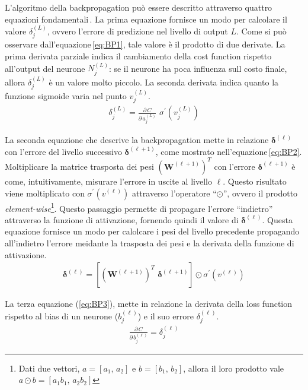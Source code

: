 L'algoritmo della backpropagation può essere descritto attraverso quattro equazioni fondamentali\,\cite{nielsen2015neural}. La prima equazione fornisce un modo per calcolare il valore $\delta^{(L)}_j$, ovvero l'errore di predizione nel livello di output $L$. Come si può osservare dall'equazione\,\ref{eq:BP1}, tale valore è il prodotto di due derivate. La prima derivata parziale indica il cambiamento della cost function rispetto all'output del neurone $N^{(L)}_j$: se il neurone ha poca influenza sull costo finale, allora $\delta^{(L)}_j$ è un valore molto piccolo. La seconda derivata indica quanto la funzione sigmoide varia nel punto $v^{(L)}_j$.
% 
\begin{gather}
    \delta^{(L)}_j = \frac{\partial\,C}{\partial\,a^{(L)}_j} \,\, \sigma^\prime \left( v^{(L)}_j \right)
    \label{eq:BP1}
\end{gather}

La seconda equazione che descrive la backpropagation mette in relazione $\boldsymbol{\delta}^{(\ell)}$ con l'errore del livello successivo $\boldsymbol{\delta}^{(\ell + 1)}$, come mostrato nell'equazione\,\ref*{eq:BP2}. Moltiplicare la matrice trasposta dei pesi ${\left( \mathbf{W}^{(\ell + 1)} \right)}^T$ con l'errore $\boldsymbol{\delta}^{(\ell + 1)}$ è come, intuitivamente, misurare l'errore in uscite al livello $\ell$. Questo risultato viene moltiplicato con $\sigma^\prime \left( v^{(\ell)} \right)$ attraverso l'operatore ``$\odot$'', ovvero il prodotto \textit{element-wise}\footnote{Dati due vettori, $a = \left[ a_1,\,a_2\right]$ e $b = \left[ b_1,\,b_2\right]$, allora il loro prodotto vale $ a \odot b = \left[ a_1b_1,\,a_2b_2\right]$}. Questo passaggio permette di propagare l'errore ``indietro'' attraverso la funzione di attivazione, fornendo quindi il valore di $\boldsymbol{\delta}^{(\ell)}$. Questa equazione fornisce un modo per calolcare i pesi del livello precedente propagando all'indietro l'errore meidante la trasposta dei pesi e la derivata della funzione di attivazione.
% 
\begin{gather}
    \boldsymbol{\delta}^{(\ell)} = \left[ {\left( \mathbf{W}^{(\ell + 1)} \right)}^T \,\, \boldsymbol{\delta}^{(\ell + 1)} \right] \odot \sigma^\prime \left( v^{(\ell)} \right)
    \label{eq:BP2}
\end{gather}

La terza equazione (\ref{eq:BP3}), mette in relazione la derivata della loss function rispetto al bias di un neurone ($b^{(\ell)}_j$) e il suo errore $\delta^{(\ell)}_j$.
% 
\begin{gather}
    \frac{\partial\,C}{\partial\,b^{(\ell)}_j} = \delta^{(\ell)}_j
    \label{eq:BP3}
\end{gather}

